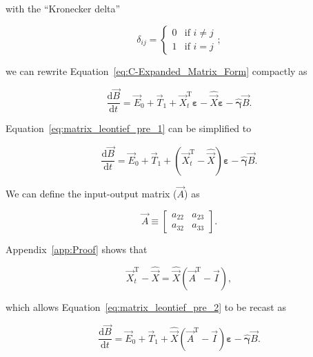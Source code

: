 \noindent{}with the ``Kronecker delta''

\begin{equation}\label{eq:k_delta}
	\delta_{ij} 
	=
	\begin{cases}	
		0	&	\text{if  } i \neq j	\\
		1 	& 	\text{if  } i = j
	\end{cases};
\end{equation}

\noindent{}we can rewrite Equation~\ref{eq:C-Expanded_Matrix_Form}
compactly as

\begin{equation} \label{eq:matrix_leontief_pre_1}
	\frac{\mathrm{d}\vec{B}}{\mathrm{d}t} 
	= \vec{E}_{0}
	+ \vec{T}_{1}
	+ \vec{X}_{t}^{\mathrm{T}}\bm{\varepsilon} 
	- \hat{\vec{X}}\bm{\varepsilon}
	- \hat{\bm{\gamma}}\vec{B}.
\end{equation}

\noindent{}Equation~\ref{eq:matrix_leontief_pre_1} can be simplified to

\begin{equation} \label{eq:matrix_leontief_pre_2}
	\frac{\mathrm{d}\vec{B}}{\mathrm{d}t} 
	= \vec{E}_{0}
	+ \vec{T}_{1}
	+ (\vec{X}_{t}^{\mathrm{T}} - \hat{\vec{X}})\bm{\varepsilon} 
	- \hat{\bm{\gamma}}\vec{B}.
\end{equation}

\noindent{}We can define the input-output matrix ($\vec{A}$) as

\begin{equation} \label{eq:A_matrix_def}
	\vec{A} 
	\equiv
	\begin{bmatrix}
		a_{22} & a_{23}	\\
		a_{32} & a_{33}	
	\end{bmatrix}.
\end{equation}

\noindent{}Appendix~\ref{app:Proof} shows that

\begin{equation} \label{eq:Xdifference1}
	\vec{X}_{t}^{\mathrm{T}} 
	- \hat{\vec{X}} 
	= \hat{\vec{X}} (\vec{A}^{\mathrm{T}} - \vec{I}),
\end{equation}

\noindent{}which allows Equation~\ref{eq:matrix_leontief_pre_2}
to be recast as

\begin{equation} \label{eq:matrix_leontief}
	\frac{\mathrm{d}\vec{B}}{\mathrm{d}t} 
	= \vec{E}_{0}
	+ \vec{T}_{1}
	+ \hat{\vec{X}} (\vec{A}^{\mathrm{T}} - \vec{I})\bm{\varepsilon} 
	- \hat{\bm{\gamma}}\vec{B}.
\end{equation}

